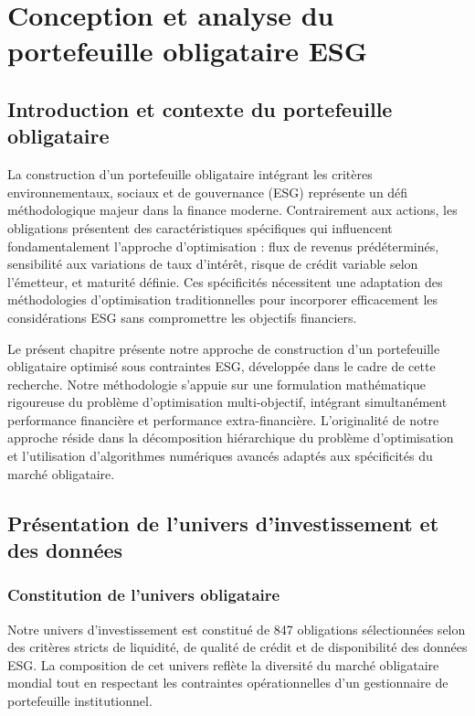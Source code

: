 \chapter{Conception et analyse du portefeuille obligataire ESG}

\section{Introduction et contexte du portefeuille obligataire}

La construction d'un portefeuille obligataire intégrant les critères environnementaux, sociaux et de gouvernance (ESG) représente un défi méthodologique majeur dans la finance moderne. Contrairement aux actions, les obligations présentent des caractéristiques spécifiques qui influencent fondamentalement l'approche d'optimisation : flux de revenus prédéterminés, sensibilité aux variations de taux d'intérêt, risque de crédit variable selon l'émetteur, et maturité définie. Ces spécificités nécessitent une adaptation des méthodologies d'optimisation traditionnelles pour incorporer efficacement les considérations ESG sans compromettre les objectifs financiers.

Le présent chapitre présente notre approche de construction d'un portefeuille obligataire optimisé sous contraintes ESG, développée dans le cadre de cette recherche. Notre méthodologie s'appuie sur une formulation mathématique rigoureuse du problème d'optimisation multi-objectif, intégrant simultanément performance financière et performance extra-financière. L'originalité de notre approche réside dans la décomposition hiérarchique du problème d'optimisation et l'utilisation d'algorithmes numériques avancés adaptés aux spécificités du marché obligataire.

\section{Présentation de l'univers d'investissement et des données}

\subsection{Constitution de l'univers obligataire}

Notre univers d'investissement est constitué de 847 obligations sélectionnées selon des critères stricts de liquidité, de qualité de crédit et de disponibilité des données ESG. La composition de cet univers reflète la diversité du marché obligataire mondial tout en respectant les contraintes opérationnelles d'un gestionnaire de portefeuille institutionnel.

